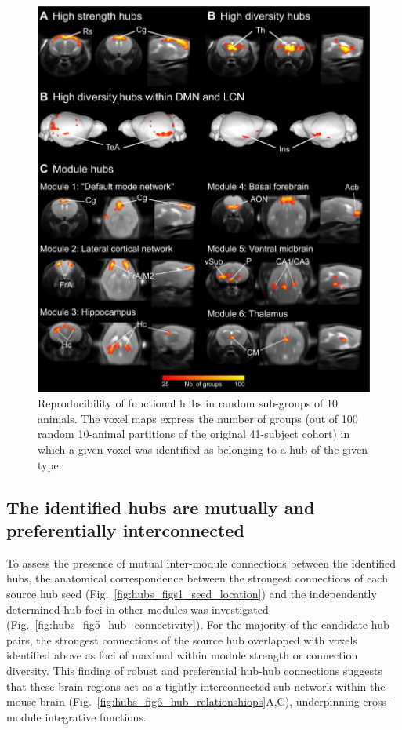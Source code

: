 \begin{figure}[th]
    \centering
    \includegraphics[scale=0.8]{figures/hubs_figure_s6_hub_reproducibility_10_animals_NEW.png}
    \decoRule
    \caption[Reproducibility of functional hubs in random sub-groups of 10
    animals.]{Reproducibility of functional hubs in random sub-groups of 10
    animals. The voxel maps express the number of groups (out of 100 random
    10-animal partitions of the original 41-subject cohort) in which a given
    voxel was identified as belonging to a hub of the given type.}
    \label{fig:hubs_figs6_reproducibility}
\end{figure}

\subsection{The identified hubs are mutually and preferentially interconnected}

To assess the presence of mutual inter-module connections between the identified
hubs, the anatomical correspondence between the strongest connections of each
source hub seed (Fig.~\ref{fig:hubs_figs1_seed_location}) and the independently
determined hub foci in other modules was investigated
(Fig.~\ref{fig:hubs_fig5_hub_connectivity}). For the majority of the candidate
hub pairs, the strongest connections of the source hub overlapped with voxels
identified above as foci of maximal within module strength or connection
diversity. This finding of robust and preferential hub-hub connections suggests
that these brain regions act as a tightly interconnected sub-network within the
mouse brain (Fig.~\ref{fig:hubs_fig6_hub_relationshiops}A,C), underpinning cross-module integrative functions.

